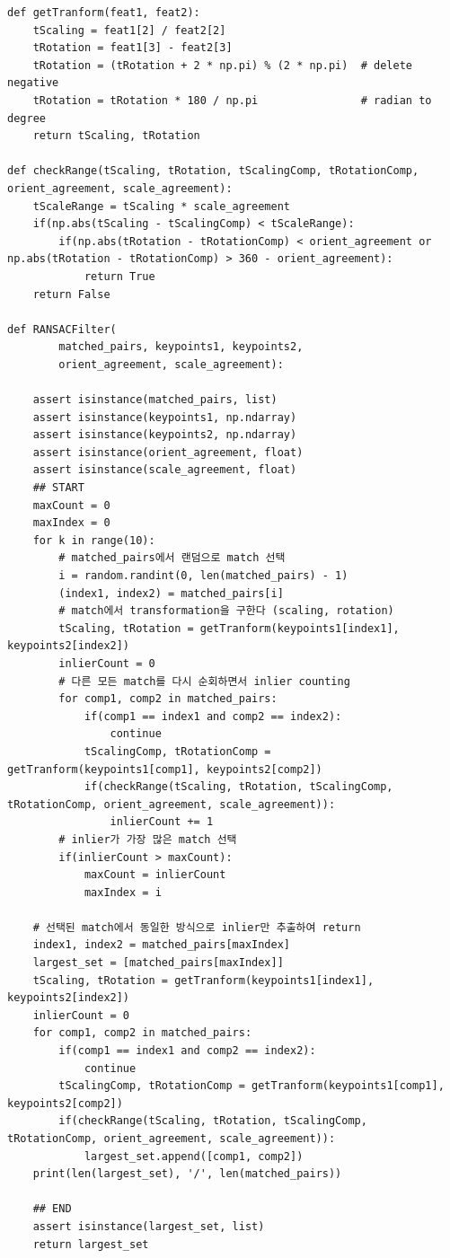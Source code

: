 \documentclass[]{report}
\begin{document}
\begin{lstlisting}
def getTranform(feat1, feat2):
    tScaling = feat1[2] / feat2[2]
    tRotation = feat1[3] - feat2[3]
    tRotation = (tRotation + 2 * np.pi) % (2 * np.pi)  # delete negative
    tRotation = tRotation * 180 / np.pi                # radian to degree
    return tScaling, tRotation

def checkRange(tScaling, tRotation, tScalingComp, tRotationComp, orient_agreement, scale_agreement):
    tScaleRange = tScaling * scale_agreement
    if(np.abs(tScaling - tScalingComp) < tScaleRange):
        if(np.abs(tRotation - tRotationComp) < orient_agreement or np.abs(tRotation - tRotationComp) > 360 - orient_agreement):
            return True
    return False

def RANSACFilter(
        matched_pairs, keypoints1, keypoints2,
        orient_agreement, scale_agreement):

    assert isinstance(matched_pairs, list)
    assert isinstance(keypoints1, np.ndarray)
    assert isinstance(keypoints2, np.ndarray)
    assert isinstance(orient_agreement, float)
    assert isinstance(scale_agreement, float)
    ## START
    maxCount = 0
    maxIndex = 0
    for k in range(10):
        # matched_pairs에서 랜덤으로 match 선택
        i = random.randint(0, len(matched_pairs) - 1)
        (index1, index2) = matched_pairs[i]
        # match에서 transformation을 구한다 (scaling, rotation)
        tScaling, tRotation = getTranform(keypoints1[index1], keypoints2[index2])
        inlierCount = 0
        # 다른 모든 match를 다시 순회하면서 inlier counting
        for comp1, comp2 in matched_pairs:
            if(comp1 == index1 and comp2 == index2):
                continue
            tScalingComp, tRotationComp = getTranform(keypoints1[comp1], keypoints2[comp2])
            if(checkRange(tScaling, tRotation, tScalingComp, tRotationComp, orient_agreement, scale_agreement)):
                inlierCount += 1
        # inlier가 가장 많은 match 선택
        if(inlierCount > maxCount):
            maxCount = inlierCount
            maxIndex = i
    
    # 선택된 match에서 동일한 방식으로 inlier만 추출하여 return
    index1, index2 = matched_pairs[maxIndex]
    largest_set = [matched_pairs[maxIndex]]
    tScaling, tRotation = getTranform(keypoints1[index1], keypoints2[index2])
    inlierCount = 0
    for comp1, comp2 in matched_pairs:
        if(comp1 == index1 and comp2 == index2):
            continue
        tScalingComp, tRotationComp = getTranform(keypoints1[comp1], keypoints2[comp2])
        if(checkRange(tScaling, tRotation, tScalingComp, tRotationComp, orient_agreement, scale_agreement)):
            largest_set.append([comp1, comp2])
    print(len(largest_set), '/', len(matched_pairs))
    
    ## END
    assert isinstance(largest_set, list)
    return largest_set
\end{lstlisting}
\end{document}
